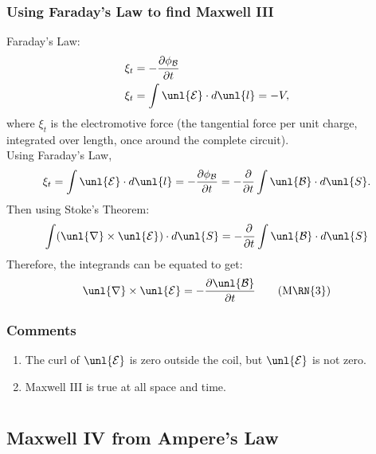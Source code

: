 \documentclass[a4paper, 11pt, normalem]{report}
\newcommand\p{\partial}
\newcommand\E{\mathcal{E}}
\newcommand\uE{\unl{\E}}
\newcommand\B{\mathcal{B}}
\newcommand\uB{\unl{\B}}
\newcommand\del{\unl{\nabla}}
\begin{document}
\subsection{Using Faraday's Law to find Maxwell \RN{3}}
Faraday's Law:
\begin{align}
    \xi_t &= -\frac{\p \phi_\B}{\p t} \\
    \xi_t &= \int \uE \cdot d\unl{l} = -V,
\end{align}
where $\xi_t$ is the electromotive force (the tangential force per unit charge, integrated over length, once around the complete circuit). \\
Using Faraday's Law,
\begin{equation}
    \xi_t = \int \uE\cdot d\unl{l} = -\frac{\p \phi_\B}{\p t} = -\frac{\p}{\p t}\int \uB \cdot d\unl{S}.
\end{equation}
Then using Stoke's Theorem:
\begin{equation}
    \int (\del \times \uE) \cdot d\unl{S} = -\frac{\p}{\p t}\int \uB \cdot d\unl{S}
\end{equation}
Therefore, the integrands can be equated to get:
\begin{equation}
    \del \times \uE = -\frac{\p \uB}{\p t} \tag{M\RN{3}}
\end{equation}

\subsection{Comments}
\begin{enumerate}
    \item The curl of $\uE$ is zero outside the coil, but $\uE$ is not zero.
    \item Maxwell \RN{3} is true at all space and time.
\end{enumerate}

\chapter{}
\section{Maxwell \RN{4} from Ampere's Law}
\end{document}
